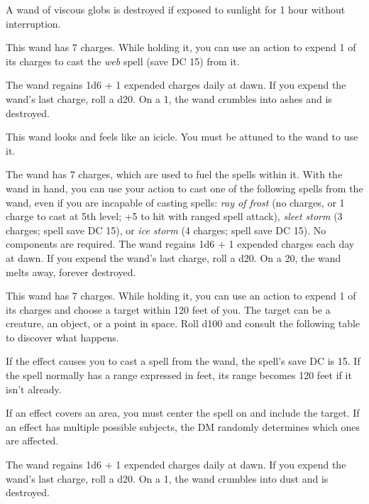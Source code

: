 \documentclass[10pt,a4paper,twoside,bg=print,twocolumn,openany,nodeprecatedcode]{dndbook}
\begin{document}
A wand of viscous globs is destroyed if exposed to sunlight for 1 hour without interruption.

This wand has 7 charges. While holding it, you can use an action to expend 1 of its charges to cast the \textit{web} spell (save DC 15) from it.

The wand regains 1d6 + 1 expended charges daily at dawn. If you expend the wand's last charge, roll a d20. On a 1, the wand crumbles into ashes and is destroyed.

This wand looks and feels like an icicle. You must be attuned to the wand to use it.

The wand has 7 charges, which are used to fuel the spells within it. With the wand in hand, you can use your action to cast one of the following spells from the wand, even if you are incapable of casting spells: \textit{ray of frost} (no charges, or 1 charge to cast at 5th level; +5 to hit with ranged spell attack), \textit{sleet storm} (3 charges; spell save DC 15), or \textit{ice storm} (4 charges; spell save DC 15). No components are required. The wand regains 1d6 + 1 expended charges each day at dawn. If you expend the wand's last charge, roll a d20. On a 20, the wand melts away, forever destroyed.

This wand has 7 charges. While holding it, you can use an action to expend 1 of its charges and choose a target within 120 feet of you. The target can be a creature, an object, or a point in space. Roll d100 and consult the following table to discover what happens.

If the effect causes you to cast a spell from the wand, the spell's save DC is 15. If the spell normally has a range expressed in feet, its range becomes 120 feet if it isn't already.

If an effect covers an area, you must center the spell on and include the target. If an effect has multiple possible subjects, the DM randomly determines which ones are affected.

The wand regains 1d6 + 1 expended charges daily at dawn. If you expend the wand's last charge, roll a d20. On a 1, the wand crumbles into dust and is destroyed.
\end{document}
